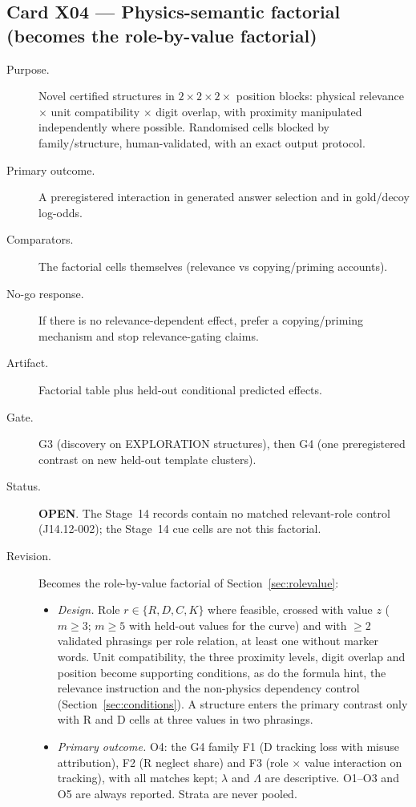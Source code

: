 \documentclass[10pt,a4paper]{article}
\begin{document}
\subsection{Card X04 --- Physics-semantic factorial (becomes the role-by-value factorial)}
\label{card:X04}
\begin{description}
\item[Purpose.] Novel certified structures in $2\times2\times2\times$ position blocks: physical relevance
$\times$ unit compatibility $\times$ digit overlap, with proximity manipulated independently where possible.
Randomised cells blocked by family/structure, human-validated, with an exact output protocol.
\item[Primary outcome.] A preregistered interaction in generated answer selection and in gold/decoy log-odds.
\item[Comparators.] The factorial cells themselves (relevance vs copying/priming accounts).
\item[No-go response.] If there is no relevance-dependent effect, prefer a copying/priming mechanism and stop
relevance-gating claims.
\item[Artifact.] Factorial table plus held-out conditional predicted effects.
\item[Gate.] G3 (discovery on EXPLORATION structures), then G4 (one preregistered contrast on new held-out
template clusters).
\item[Status.] \textbf{OPEN}. The Stage~14 records contain no matched relevant-role control (J14.12-002); the
Stage~14 cue cells are not this factorial.
\item[Revision.] Becomes the role-by-value factorial of Section~\ref{sec:rolevalue}:
\begin{itemize}
\item \emph{Design.} Role $r\in\{R,D,C,K\}$ where feasible, crossed with value $z$ ($m\geq3$; $m\geq5$ with
held-out values for the curve) and with $\geq2$ validated phrasings per role relation, at least one without marker
words. Unit compatibility, the three proximity levels, digit overlap and position become supporting conditions, as
do the formula hint, the relevance instruction and the non-physics dependency control
(Section~\ref{sec:conditions}). A structure enters the primary contrast only with R and D cells at three values in
two phrasings.
\item \emph{Primary outcome.} O4: the G4 family F1 (D tracking loss with misuse attribution), F2 (R neglect share)
and F3 (role $\times$ value interaction on tracking), with all matches kept; $\lambda$ and $\Lambda$ are descriptive. O1--O3 and O5 are always reported. Strata are never pooled.

\end{itemize}
\end{description}
\end{document}

